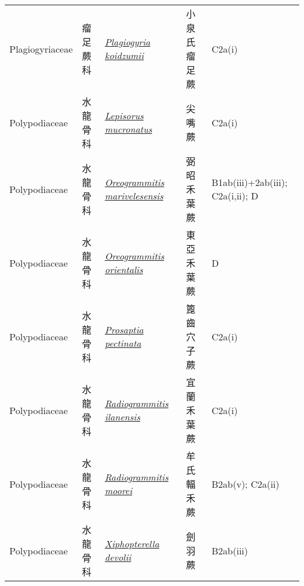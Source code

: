 {\begin{longtable}{L{2.5cm}L{2cm}L{5cm}L{2.5cm}L{3cm}}
    Plagiogyriaceae & 瘤足蕨科 & \href{http://www.theplantlist.org/tpl1.1/search?q=Plagiogyria+koidzumii}{\textit{Plagiogyria koidzumii} } & 小泉氏瘤足蕨 & C2a(i)    \\
    Polypodiaceae & 水龍骨科 & \href{http://www.theplantlist.org/tpl1.1/search?q=Lepisorus+mucronatus}{\textit{Lepisorus mucronatus} } & 尖嘴蕨 & C2a(i)    \\
    Polypodiaceae & 水龍骨科 & \href{http://www.theplantlist.org/tpl1.1/search?q=Oreogrammitis+marivelesensis}{\textit{Oreogrammitis marivelesensis} } & 弼昭禾葉蕨 & B1ab(iii)+2ab(iii); C2a(i,ii); D    \\
    Polypodiaceae & 水龍骨科 & \href{http://www.theplantlist.org/tpl1.1/search?q=Oreogrammitis+orientalis}{\textit{Oreogrammitis orientalis} } & 東亞禾葉蕨 & D    \\
    Polypodiaceae & 水龍骨科 & \href{http://www.theplantlist.org/tpl1.1/search?q=Prosaptia+pectinata}{\textit{Prosaptia pectinata} } & 篦齒穴子蕨 & C2a(i)    \\
    Polypodiaceae & 水龍骨科 & \href{http://www.theplantlist.org/tpl1.1/search?q=Radiogrammitis+ilanensis}{\textit{Radiogrammitis ilanensis} } & 宜蘭禾葉蕨 & C2a(i)    \\
    Polypodiaceae & 水龍骨科 & \href{http://www.theplantlist.org/tpl1.1/search?q=Radiogrammitis+moorei}{\textit{Radiogrammitis moorei} } & 牟氏輻禾蕨 & B2ab(v); C2a(ii)    \\
    Polypodiaceae & 水龍骨科 & \href{http://www.theplantlist.org/tpl1.1/search?q=Xiphopterella+devolii}{\textit{Xiphopterella devolii} } & 劍羽蕨 & B2ab(iii)    \\

\end{longtable}}

